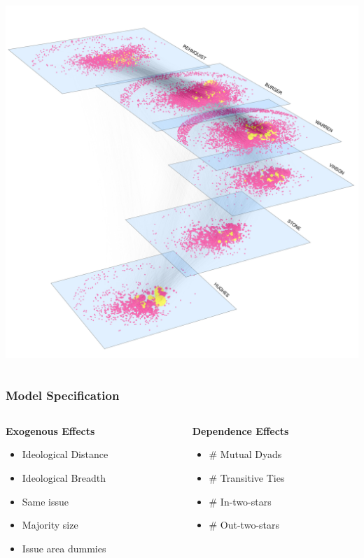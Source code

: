 \documentclass[handout]{beamer}
\begin{document}
\begin{frame}
\begin{columns}
\begin{column}{6cm}
\includegraphics[scale=0.15,clip=true,trim=.5cm 0cm 0cm 2cm]{../../../NetworkVisualizations/citations1}
\end{column}

\end{columns}


\end{frame}

\begin{frame} \frametitle{Model Specification}

\begin{columns}
\begin{column}{5cm}
{\bf Exogenous Effects}
\begin{itemize}
\item Ideological Distance
\item Ideological Breadth
\item Same issue
\item Majority size
\item Issue area dummies
\end{itemize}
\end{column}

\begin{column}{6cm}
{\bf Dependence Effects}

\begin{itemize}
\item \# Mutual Dyads
\item \# Transitive Ties
\item \# In-two-stars
\item  \# Out-two-stars
\end{itemize}

\end{column}

\end{columns}


\end{frame}
\end{document}
